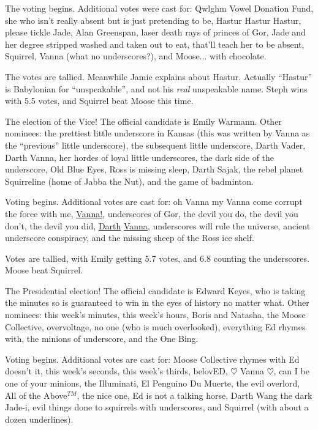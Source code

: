 \documentclass[12pt]{article}
\begin{document}
The voting begins.  Additional votes were cast for: Qwlghm Vowel Donation
Fund, she who isn't really absent but is just pretending to be, Hastur
Hastur Hastur, please tickle Jade, Alan Greenspan, laser death rays of
princes of Gor, Jade and her degree stripped washed and taken out to eat,
that'll teach her to be absent, Squirrel, Vanna (what no underscores?),
and Moose... with chocolate.

The votes are tallied.  Meanwhile Jamie explains about Hastur.  Actually
``Hastur'' is Babylonian for ``unspeakable'', and not his {\em real}
unspeakable name.  Steph wins with 5.5 votes, and Squirrel beat Moose
this time.

The election of the Vice!  The official candidate is Emily Warmann.  Other
nominees: the prettiest little underscore in Kansas (this was written by
Vanna as the ``previous'' little underscore), the subsequent little
underscore, Darth Vader, Darth Vanna, her hordes of loyal little underscores,
the dark side of the underscore, Old Blue Eyes, Ross is missing sleep,
Darth Sajak, the rebel planet Squirreline (home of Jabba the Nut), and the
game of badminton.

Voting begins.  Additional votes are cast for: oh Vanna my Vanna come
corrupt the force with me, \underline{\underline{\underline{Vanna!}}},
underscores of Gor, the devil you do, the devil you don't, the devil you
did, \underline{Darth} \underline{\underline{Vanna}}, underscores will
rule the universe, ancient underscore conspiracy, and the missing sheep of
the Ross ice shelf.

Votes are tallied, with Emily getting 5.7 votes, and 6.8 counting the
underscores.  Moose beat Squirrel.

The Presidential election!  The official candidate is Edward Keyes, who
is taking the minutes so is guaranteed to win in the eyes of history no
matter what.  Other nominees: this week's minutes, this week's hours,
Boris and Natasha, the Moose Collective, overvoltage, no one (who is much
overlooked), everything Ed rhymes with, the minions of underscore, and
the One Bing.

Voting begins.  Additional votes are cast for: Moose Collective rhymes
with Ed doesn't it, this week's seconds, this week's thirds, belovED,
$\heartsuit$ Vanna $\heartsuit$, can I be one of your minions, the Illuminati,
El Penguino Du Muerte, the evil overlord, All of the Above$^{TM}$, the
nice one, Ed is not a talking horse, Darth Wang the dark Jade-i, evil
things done to squirrels with underscores, and Squirrel (with about a dozen
underlines).
\end{document}
